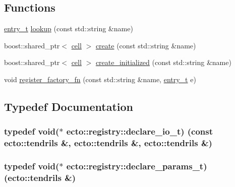 \subsection*{Functions}
\begin{DoxyCompactItemize}
\item 
\hyperlink{structecto_1_1registry_1_1entry__t}{entry\+\_\+t} \hyperlink{namespaceecto_1_1registry_a6418eb4a71ad1556cf3555da28e16a8d}{lookup} (const std\+::string \&name)
\item 
boost\+::shared\+\_\+ptr$<$ \hyperlink{structecto_1_1cell}{cell} $>$ \hyperlink{namespaceecto_1_1registry_a784e20c3d722892c0ce9f129b6c2f757}{create} (const std\+::string \&name)
\item 
boost\+::shared\+\_\+ptr$<$ \hyperlink{structecto_1_1cell}{cell} $>$ \hyperlink{namespaceecto_1_1registry_af698665e1f634f8634ecd7348aa778ab}{create\+\_\+initialized} (const std\+::string \&name)
\item 
void \hyperlink{namespaceecto_1_1registry_aef6687acec4199b3863fac767049bf76}{register\+\_\+factory\+\_\+fn} (const std\+::string \&name, \hyperlink{structecto_1_1registry_1_1entry__t}{entry\+\_\+t} e)
\end{DoxyCompactItemize}


\subsection{Typedef Documentation}
\subsubsection[{\texorpdfstring{declare\+\_\+io\+\_\+t}{declare_io_t}}]{\setlength{\rightskip}{0pt plus 5cm}typedef void($\ast$ ecto\+::registry\+::declare\+\_\+io\+\_\+t) (const {\bf ecto\+::tendrils} \&, {\bf ecto\+::tendrils} \&, {\bf ecto\+::tendrils} \&)}\hypertarget{namespaceecto_1_1registry_aeb28ed8594052fabba16371c256380c4}{}\label{namespaceecto_1_1registry_aeb28ed8594052fabba16371c256380c4}
\subsubsection[{\texorpdfstring{declare\+\_\+params\+\_\+t}{declare_params_t}}]{\setlength{\rightskip}{0pt plus 5cm}typedef void($\ast$ ecto\+::registry\+::declare\+\_\+params\+\_\+t) ({\bf ecto\+::tendrils} \&)}\hypertarget{namespaceecto_1_1registry_ac7ab506518f9462777eb958eeff86d4f}{}\label{namespaceecto_1_1registry_ac7ab506518f9462777eb958eeff86d4f}

